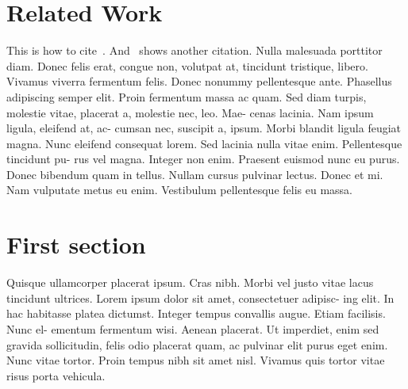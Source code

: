 \documentclass{utue} %
\begin{document}
\section{Related Work}
This is how to cite~\cite{Coyne2001}.
And~\cite{Miller1995} shows another citation.
Nulla malesuada porttitor diam. Donec felis erat,
congue non, volutpat at, tincidunt tristique, libero.
Vivamus viverra fermentum felis. Donec nonummy
pellentesque ante. Phasellus adipiscing semper elit.
Proin fermentum massa ac quam. Sed diam turpis,
molestie vitae, placerat a, molestie nec, leo. Mae-
cenas lacinia. Nam ipsum ligula, eleifend at, ac-
cumsan nec, suscipit a, ipsum. Morbi blandit ligula
feugiat magna. Nunc eleifend consequat lorem. Sed
lacinia nulla vitae enim. Pellentesque tincidunt pu-
rus vel magna. Integer non enim. Praesent euismod
nunc eu purus. Donec bibendum quam in tellus.
Nullam cursus pulvinar lectus. Donec et mi. Nam
vulputate metus eu enim. Vestibulum pellentesque
felis eu massa.

\section{First section}
Quisque ullamcorper placerat ipsum. Cras nibh.
Morbi vel justo vitae lacus tincidunt ultrices.
Lorem ipsum dolor sit amet, consectetuer adipisc-
ing elit. In hac habitasse platea dictumst. Integer
tempus convallis augue. Etiam facilisis. Nunc el-
ementum fermentum wisi. Aenean placerat. Ut
imperdiet, enim sed gravida sollicitudin, felis odio
placerat quam, ac pulvinar elit purus eget enim.
Nunc vitae tortor. Proin tempus nibh sit amet nisl.
Vivamus quis tortor vitae risus porta vehicula.
\end{document}
